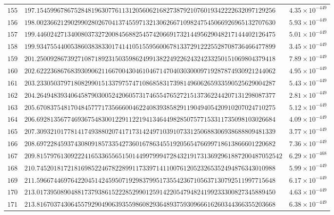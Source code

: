 \documentclass[12pt,reqno]{amsart}
\theoremstyle{remark}
\begin{document}
\begin{longtable}{clc}
$155$ & $197.1545996786752848196307761131205606216827387921076019342222632097129256$ & $4.35\times 10^{-449}$ \\
$156$ & $198.0023662129029902802670413745597132130626671098247545066926965132707630$ & $5.93\times 10^{-449}$ \\
$157$ & $199.4460242713400803732720084568825457420669173214495629048217144402126475$ & $5.01\times 10^{-449}$ \\
$158$ & $199.9347554400538603838330174141051559560067813372912225528708736466477899$ & $3.45\times 10^{-449}$ \\
$159$ & $201.2500928673927108718923150359862499138224922624324233250151069804379418$ & $7.89\times 10^{-449}$ \\
$160$ & $202.6222368676839309062116670043046104671470403030009719287874930921244062$ & $4.95\times 10^{-449}$ \\
$161$ & $203.2330503797180829901513379757471086858317398149606265933590525629004287$ & $5.43\times 10^{-449}$ \\
$162$ & $204.2649483934064587903005242060573174655476527215137362244207131298087377$ & $2.81\times 10^{-449}$ \\
$163$ & $205.6708375481704845777173566600462240839385829119049405420910207024710275$ & $5.12\times 10^{-449}$ \\
$164$ & $206.6928135677469367548300122911221941346449828507577153311735098103026684$ & $4.09\times 10^{-449}$ \\
$165$ & $207.3093210177814174938802074171731424971039107331250688306938688809481339$ & $3.77\times 10^{-449}$ \\
$166$ & $208.6972284593743080918573354273601678634551920565476699718613866601220682$ & $7.36\times 10^{-449}$ \\
$167$ & $209.815797613092224165336556515014499799947284321917313692961887200487052542$ & $6.29\times 10^{-468}$ \\
$168$ & $210.7452018172181698522467822899117339714110076120523265352494876343010988$ & $5.99\times 10^{-449}$ \\
$169$ & $211.5966744697642204514245950719298379951735542367105637130792511997715648$ & $6.17\times 10^{-449}$ \\
$170$ & $213.0173950890488173793861522285299012591422054794824199233300827345889450$ & $4.63\times 10^{-449}$ \\
$171$ & $213.8167037430645579290490639355986082936489375930966616260344366355203668$ & $6.38\times 10^{-449}$ \\

\end{longtable}
\end{document}
